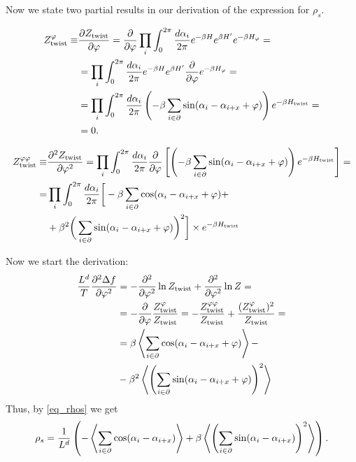 Now we state two partial results in our derivation of the expression for $\rho_s$.

\begin{align}
  Z^{\varphi}_{\textrm{twist}}\equiv&\frac{\partial Z_{\textrm{twist}}}{\partial \varphi} =  \frac{\partial}{\partial \varphi}\prod_{i}\int_{0}^{2\pi}\frac{d \alpha_i}{2\pi} e^{ -\beta H}e^{\beta H'} e^{-\beta H_\varphi}= \\
   &=  \prod_{i}\int_{0}^{2\pi}\frac{d \alpha_i}{2\pi} e^{ -\beta H}e^{\beta H'}\frac{\partial}{\partial \varphi} e^{-\beta H_\varphi}= \\
  &= \prod_{i}\int_{0}^{2\pi}\frac{d \alpha_i}{2\pi} \left(-\beta\sum\limits_{i\in\partial} \sin(\alpha_i - \alpha_{i+x} + \varphi)\right)e^{ -\beta H_{\textrm{twist}}} = \\
  &= 0.
  \label{}
\end{align}

\begin{align}
  Z^{\varphi\varphi}_{\textrm{twist}}\equiv&\frac{\partial^2 Z_{\textrm{twist}}}{\partial \varphi^2} = \prod_{i}\int_{0}^{2\pi}\frac{d \alpha_i}{2\pi} \frac{\partial}{\partial \varphi}\left[\left(-\beta\sum_{i\in\partial}\sin(\alpha_i - \alpha_{i+x} + \varphi)\right)e^{ -\beta H_{\textrm{twist}}}\right] =\\
  =& \prod_{i}\int_{0}^{2\pi}\frac{d \alpha_i}{2\pi} \bigg[-\beta\sum_{i\in\partial}\cos(\alpha_i - \alpha_{i+x} + \varphi) +\\
   &+ \beta^2\bigg(\sum_{i\in\partial}\sin(\alpha_i - \alpha_{i+x} + \varphi)\bigg)^2\bigg] \times e^{ -\beta H_{\textrm{twist}}} \\
  \label{}
\end{align}

Now we start the derivation:
\begin{align}
  \frac{L^d}{T}\frac{\partial^2 \Delta f}{\partial \varphi^2} &= -\frac{\partial^2}{\partial\varphi^2}\ln Z_{\textrm{twist}} +\frac{\partial^2}{\partial\varphi^2}\ln Z = \\
  &=-\frac{\partial }{\partial \varphi}\frac{Z^{\varphi}_{\textrm{twist}}}{Z_{\textrm{twist}}} = -\frac{Z^{\varphi\varphi}_{\textrm{twist}}}{Z_{\textrm{twist}}} + \frac{(Z^{\varphi}_{\textrm{twist}})^2}{Z_{\textrm{twist}}} =\\
  &=\beta\left\langle \sum_{i\in\partial}\cos(\alpha_i -\alpha_{i+x} + \varphi)\right\rangle - \\
  &- \beta^2\left\langle\left(\sum_{i\in\partial}\sin(\alpha_i - \alpha_{i+x} +\varphi)\right)^2\right\rangle
  \label{}
\end{align}
Thus, by \ref{eq_rhos} we get
\begin{equation}
  \rho_s = \frac{1}{L^d}\left(-\left\langle \sum_{i\in\partial}\cos(\alpha_i -\alpha_{i+x} )\right\rangle + \beta\left\langle\left(\sum_{i\in\partial}\sin(\alpha_i - \alpha_{i+x}) \right)^2\right\rangle\right).
  \label{}
\end{equation}


